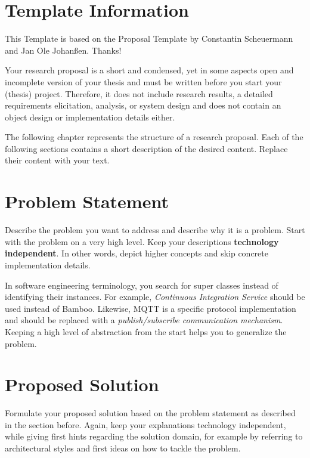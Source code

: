 \documentclass[a4paper]{article}
\begin{document}
\section*{Template Information}

This Template is based on the Proposal Template by Constantin Scheuermann and Jan Ole Johanßen. Thanks!

Your research proposal is a short and condensed, yet in some aspects open and incomplete version of your thesis and must be written before you start your (thesis) project.
Therefore, it does not include research results, a detailed requirements elicitation, analysis, or system design and does not contain an object design or implementation details either.

The following chapter represents the structure of a research proposal. 
Each of the following sections contains a short description of the desired content. Replace their content with your text.

\newpage


\section{Problem Statement}

Describe the problem you want to address and describe why it is a problem.
Start with the problem on a very high level.
Keep your descriptions \textbf{technology independent}.
In other words, depict higher concepts and skip concrete implementation details.

In software engineering terminology, you search for super classes instead of identifying their instances.
For example, \textit{Continuous Integration Service} should be used instead of Bamboo.
Likewise, MQTT is a specific protocol implementation and should be replaced with a \textit{publish/subscribe communication mechanism}.
Keeping a high level of abstraction from the start helps you to generalize the problem.

\section{Proposed Solution}

Formulate your proposed solution based on the problem statement as described in the section before.
Again, keep your explanations technology independent, while giving first hints regarding the solution domain, for example by referring to architectural styles and first ideas on how to tackle the problem.
\end{document}
